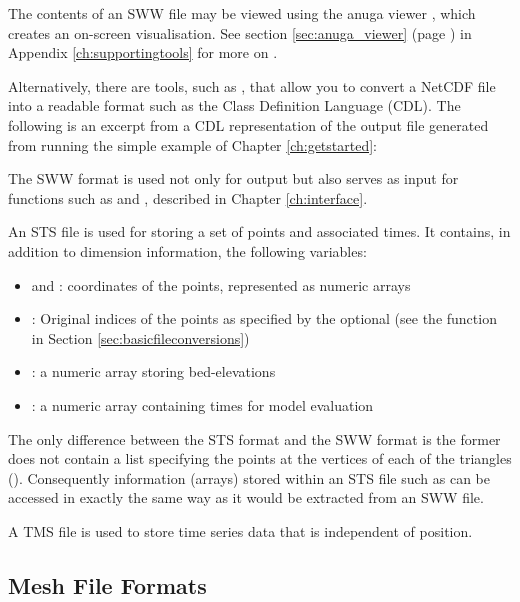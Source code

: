 \documentclass{manual}
\begin{document}
The contents of an SWW file may be viewed using the anuga viewer ,
which creates an on-screen visualisation.  See section \ref{sec:anuga_viewer}
(page \pageref{sec:anuga_viewer}) in Appendix \ref{ch:supportingtools} for more on .

Alternatively, there are tools, such as , that allow
you to convert a NetCDF file into a readable format such as the
Class Definition Language (CDL). The following is an excerpt from a
CDL representation of the output file  generated
from running the simple example  of Chapter \ref{ch:getstarted}:



The SWW format is used not only for output but also serves as input
for functions such as  and
, described in Chapter \ref{ch:interface}.

An STS file is used for storing a set of points and associated times.
It contains, in addition to dimension information, the following
variables:
\begin{itemize}
  \item {} and : coordinates of the points, represented as numeric arrays
  \item {}: Original indices of the points as specified by the optional  
                            (see the function  in Section \ref{sec:basicfileconversions})
  \item {}: a numeric array storing bed-elevations
  \item {}: a numeric array containing times for model evaluation
\end{itemize}

The only difference between the STS format and the SWW format is the former does
not contain a list specifying the points at the vertices of each of the triangles
(). Consequently information (arrays) stored within an STS file such
as  can be accessed in exactly the same way as it would be extracted
from an SWW file.

A TMS file is used to store time series data that is independent of position.

\subsection{Mesh File Formats}
\end{document}
